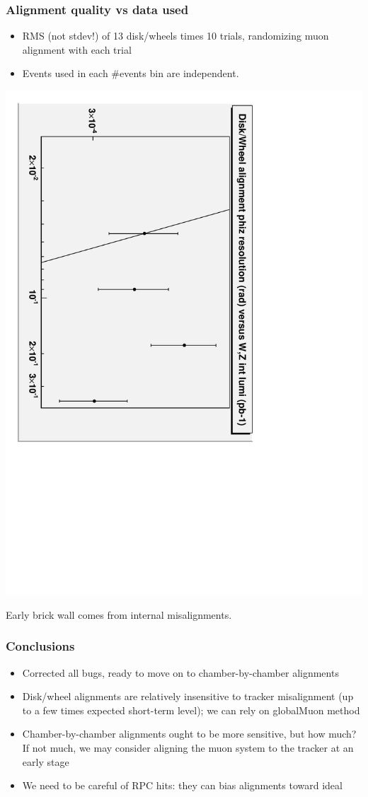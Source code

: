 \documentclass[compress]{beamer}
\begin{document}
\begin{frame}
\frametitle{Alignment quality vs data used}
\begin{itemize}
\item RMS (not stdev!) of 13 disk/wheels times 10 trials, randomizing
muon alignment with each trial
\item Events used in each \#events bin are independent.
\end{itemize}

\vfill
\begin{center}
\includegraphics[height=0.6\linewidth, angle=90]{vsevents.pdf}
\end{center}

\vfill Early brick wall comes from internal misalignments.
\end{frame}

\begin{frame}
\frametitle{Conclusions}
\begin{itemize}\setlength{\itemsep}{0.5 cm}
\item Corrected all bugs, ready to move on to chamber-by-chamber alignments
\item Disk/wheel alignments are relatively insensitive to tracker misalignment (up to a few times expected short-term level); we can rely on globalMuon method
\item Chamber-by-chamber alignments ought to be more sensitive, but how much?  If not much, we may consider aligning the muon system to the tracker at an early stage
\item We need to be careful of RPC hits: they can bias alignments toward ideal
\end{itemize}
\label{numpages}
\end{frame}
\end{document}
